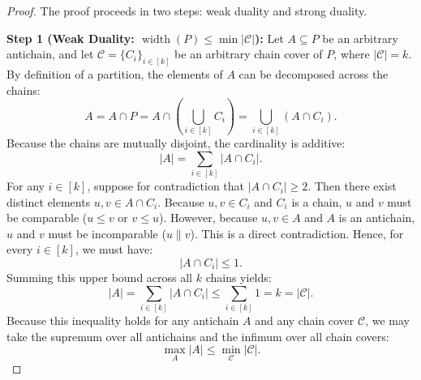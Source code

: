 \documentclass[11pt, letterpaper]{article}
\begin{document}
\begin{proof}
The proof proceeds in two steps: weak duality and strong duality.

\medskip\noindent\textbf{Step 1 (Weak Duality: $\operatorname{width}(P) \le \min |\mathcal{C}|$):}
Let $A \subseteq P$ be an arbitrary antichain, and let $\mathcal{C} = \{C_i\}_{i \in [k]}$ be an arbitrary chain cover of $P$, where $|\mathcal{C}| = k$.
By definition of a partition, the elements of $A$ can be decomposed across the chains:
\begin{equation}
    A = A \cap P = A \cap \left( \bigcup_{i \in [k]} C_i \right) = \bigcup_{i \in [k]} (A \cap C_i).
\end{equation}
Because the chains are mutually disjoint, the cardinality is additive:
\begin{equation}
    |A| = \sum_{i \in [k]} |A \cap C_i|.
\end{equation}
For any $i \in [k]$, suppose for contradiction that $|A \cap C_i| \ge 2$. Then there exist distinct elements $u, v \in A \cap C_i$. Because $u, v \in C_i$ and $C_i$ is a chain, $u$ and $v$ must be comparable ($u \le v$ or $v \le u$). However, because $u, v \in A$ and $A$ is an antichain, $u$ and $v$ must be incomparable ($u \parallel v$). This is a direct contradiction.
Hence, for every $i \in [k]$, we must have:
\begin{equation}
    |A \cap C_i| \le 1.
\end{equation}
Summing this upper bound across all $k$ chains yields:
\begin{equation}
    |A| = \sum_{i \in [k]} |A \cap C_i| \le \sum_{i \in [k]} 1 = k = |\mathcal{C}|.
\end{equation}
Because this inequality holds for any antichain $A$ and any chain cover $\mathcal{C}$, we may take the supremum over all antichains and the infimum over all chain covers:
\begin{equation}\label{eq:weak_dilworth}
    \max_{A} |A| \le \min_{\mathcal{C}} |\mathcal{C}|.
\end{equation}


\end{proof}
\end{document}
